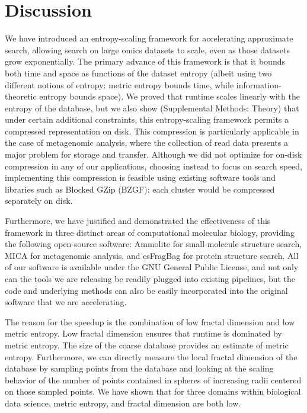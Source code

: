 \documentclass[11pt]{elsarticle}
\theoremstyle{definition}
\theoremstyle{remark}
\numberwithin{equation}{section}
\begin{document}
\section{Discussion}

We have introduced an entropy-scaling framework for accelerating approximate search, allowing search on large omics datasets to scale, even as those datasets grow exponentially.
The primary advance of this framework is that it bounds both time and space as functions of the dataset entropy (albeit using two different notions of entropy: metric entropy bounds time, while information-theoretic entropy bounds space).
We proved that runtime scales linearly with the entropy of the database, but we also show (Supplemental Methods: Theory) that under certain additional constraints, this entropy-scaling framework permits a compressed representation on disk.
This compression is particularly applicable in the case of metagenomic analysis, where the collection of read data presents a major problem for storage and transfer.
Although we did not optimize for on-disk compression in any of our applications, choosing instead to focus on search speed, implementing this compression is feasible using existing software tools and libraries such as Blocked GZip (BZGF); each cluster would be compressed separately on disk.

Furthermore, we have justified and demonstrated the effectiveness of this 
framework in
three distinct areas of computational molecular biology, providing the
following open-source software: Ammolite for
small-molecule structure search, MICA for metagenomic analysis, and esFragBag for protein structure search.
All of our software is available under the GNU General Public License, and not only can the tools we are 
releasing be readily plugged into existing pipelines, but the code and 
underlying methods can also be easily incorporated into the original 
software that we are accelerating.

The reason for the speedup is the combination of low fractal dimension and low metric entropy.
Low fractal dimension ensures that runtime is dominated by metric entropy.
The size of the coarse database provides an estimate of metric entropy.
Furthermore, we can directly measure the local fractal dimension of the database by sampling points from the database and looking at the scaling behavior of the number of points contained in spheres of increasing radii centered on those sampled points.
We have shown that for three domains within biological data science, metric entropy, and fractal dimension are both low.
\end{document}
